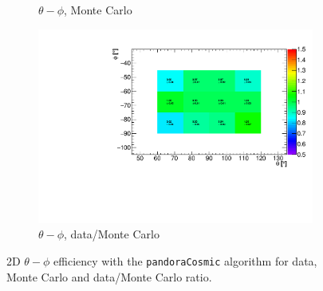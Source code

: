\documentclass[a4paper]{scrartcl}
\begin{document}
\begin{figure}[htbp]
\begin{center}
\begin{subfigure}{0.52\textwidth}
\caption{$\theta - \phi$, Monte Carlo}\label{fig:2d_cry_mc}
\end{subfigure}
\begin{subfigure}{0.52\textwidth}
\includegraphics[width=\linewidth]{ratio_theta_phi.pdf}
\caption{$\theta - \phi$, data/Monte Carlo}\label{fig:2d_cry_ratio}
\end{subfigure}
\caption{2D $\theta - \phi$ efficiency with the \texttt{pandoraCosmic} algorithm for data, Monte Carlo and data/Monte Carlo ratio.} \label{fig:cry_mc_2d}
\end{center}
\end{figure}
\end{document}
